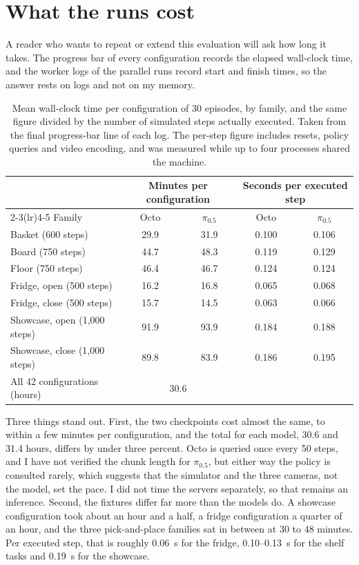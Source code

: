 \section{What the runs cost}
\label{sec:cost}

A reader who wants to repeat or extend this evaluation will ask how long it takes. The progress bar of every configuration records the elapsed wall-clock time, and the worker logs of the parallel runs record start and finish times, so the answer rests on logs and not on my memory.

{\renewcommand{\arraystretch}{1.12}
\begin{table}[H]
\centering
\small
\begin{tabular}{lcccc}
\toprule
 & \multicolumn{2}{c}{Minutes per configuration} & \multicolumn{2}{c}{Seconds per executed step} \\
\cmidrule(lr){2-3}\cmidrule(lr){4-5}
Family & Octo & $\pi_{0.5}$ & Octo & $\pi_{0.5}$ \\
\midrule
Basket (600 steps)           & 29.9 & 31.9 & 0.100 & 0.106 \\
Board (750 steps)            & 44.7 & 48.3 & 0.119 & 0.129 \\
Floor (750 steps)            & 46.4 & 46.7 & 0.124 & 0.124 \\
Fridge, open (500 steps)     & 16.2 & 16.8 & 0.065 & 0.068 \\
Fridge, close (500 steps)    & 15.7 & 14.5 & 0.063 & 0.066 \\
Showcase, open (1,000 steps) & 91.9 & 93.9 & 0.184 & 0.188 \\
Showcase, close (1,000 steps) & 89.8 & 83.9 & 0.186 & 0.195 \\
\midrule
All 42 configurations (hours) & \multicolumn{2}{c}{30.6 \quad 31.4} & & \\
\bottomrule
\end{tabular}
\caption{Mean wall-clock time per configuration of 30 episodes, by family, and the same figure divided by the number of simulated steps actually executed. Taken from the final progress-bar line of each log. The per-step figure includes resets, policy queries and video encoding, and was measured while up to four processes shared the machine.}
\label{tab:run-cost}
\end{table}}

Three things stand out. First, the two checkpoints cost almost the same, to within a few minutes per configuration, and the total for each model, 30.6 and 31.4 hours, differs by under three percent. Octo is queried once every 50 steps, and I have not verified the chunk length for $\pi_{0.5}$, but either way the policy is consulted rarely, which suggests that the simulator and the three cameras, not the model, set the pace. I did not time the servers separately, so that remains an inference. Second, the fixtures differ far more than the models do. A showcase configuration took about an hour and a half, a fridge configuration a quarter of an hour, and the three pick-and-place families sat in between at 30 to 48 minutes. Per executed step, that is roughly 0.06~s for the fridge, 0.10--0.13~s for the shelf tasks and 0.19~s for the showcase.

